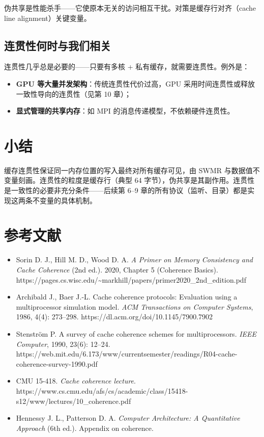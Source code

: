 伪共享是性能杀手——它使原本无关的访问相互干扰。对策是缓存行对齐（cache line alignment）关键变量。

\subsection{连贯性何时与我们相关}

连贯性几乎总是必要的——只要有多核 + 私有缓存，就需要连贯性。例外是：

\begin{itemize}
\item \textbf{GPU 等大量并发架构}：传统连贯性代价过高，GPU 采用时间连贯性或释放一致性导向的连贯性（见第 10 章）；
\item \textbf{显式管理的共享内存}：如 MPI 的消息传递模型，不依赖硬件连贯性。
\end{itemize}


\section{小结}

缓存连贯性保证同一内存位置的写入最终对所有缓存可见，由 SWMR 与数据值不变量刻画。连贯性的粒度是缓存行（典型 64 字节），伪共享是其副作用。连贯性是一致性的必要非充分条件——后续第 6–9 章的所有协议（监听、目录）都是实现这两条不变量的具体机制。

\section*{参考文献}
\begin{itemize}
\item Sorin D. J., Hill M. D., Wood D. A. \emph{A Primer on Memory Consistency and Cache Coherence} (2nd ed.). 2020, Chapter 5 (Coherence Basics). https://pages.cs.wisc.edu/\textasciitilde{}markhill/papers/primer2020\_2nd\_edition.pdf
\item Archibald J., Baer J.-L. Cache coherence protocols: Evaluation using a multiprocessor simulation model. \emph{ACM Transactions on Computer Systems}, 1986, 4(4): 273–298. https://dl.acm.org/doi/10.1145/7900.7902
\item Stenström P. A survey of cache coherence schemes for multiprocessors. \emph{IEEE Computer}, 1990, 23(6): 12–24. https://web.mit.edu/6.173/www/currentsemester/readings/R04-cache-coherence-survey-1990.pdf
\item CMU 15-418. \emph{Cache coherence lecture}. https://www.cs.cmu.edu/afs/cs/academic/class/15418-s12/www/lectures/10\_coherence.pdf
\item Hennessy J. L., Patterson D. A. \emph{Computer Architecture: A Quantitative Approach} (6th ed.). Appendix on coherence.
\end{itemize}
